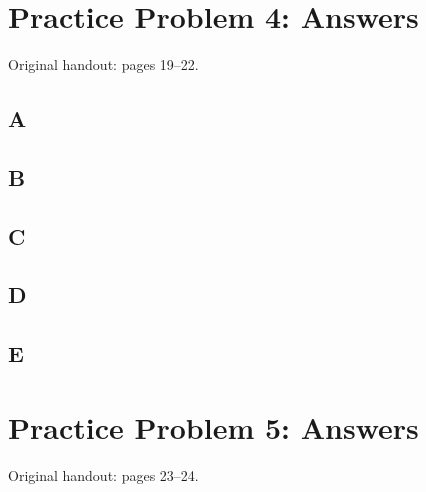 \documentclass[letterpaper,12pt]{article}
\newcommand{\handout}[1]{%
  
}
\newenvironment{answer}{\par}{\par\medskip}
\begin{document}
\clearpage

\handout{19-22}
\section*{Practice Problem 4: Answers}
\noindent Original handout: pages 19--22.\par

\subsection*{A}
\begin{answer}
  \vspace{2cm}
\end{answer}

\subsection*{B}
\begin{answer}
  \vspace{2cm}
\end{answer}

\subsection*{C}
\begin{answer}
  \vspace{2cm}
\end{answer}

\subsection*{D}
\begin{answer}
  \vspace{2cm}
\end{answer}

\subsection*{E}
\begin{answer}
  \vspace{2cm}
\end{answer}

\clearpage

\handout{23-24}
\section*{Practice Problem 5: Answers}
\noindent Original handout: pages 23--24.\par
\end{document}
